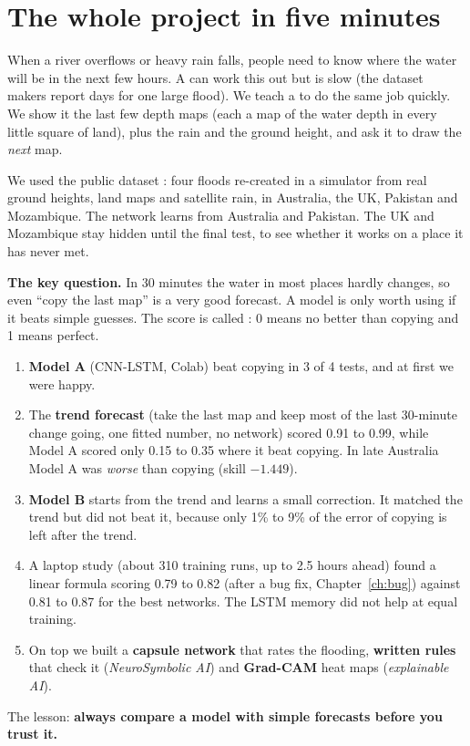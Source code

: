 \section{The whole project in five minutes}\label{ch:whole}

When a river overflows or heavy rain falls, people need to know where the water will be in the next few hours. A  can work this out but is slow (the dataset makers report days for one large flood). We teach a  to do the same job quickly. We show it the last few depth maps (each a map of the water depth in every little square of land), plus the rain and the ground height, and ask it to draw the \emph{next} map.

We used the public dataset : four floods re-created in a simulator from real ground heights, land maps and satellite rain, in Australia, the UK, Pakistan and Mozambique. The network learns from Australia and Pakistan. The UK and Mozambique stay hidden until the final test, to see whether it works on a place it has never met.

\textbf{The key question.} In 30 minutes the water in most places hardly changes, so even ``copy the last map'' is a very good forecast. A model is only worth using if it beats simple guesses. The score is called : 0 means no better than copying and 1 means perfect.

\begin{enumerate}
\item \textbf{Model A} (CNN-LSTM, Colab) beat copying in 3 of 4 tests, and at first we were happy.
\item The \textbf{trend forecast} (take the last map and keep most of the last 30-minute change going, one fitted number, no network) scored 0.91 to 0.99, while Model A scored only 0.15 to 0.35 where it beat copying. In late Australia Model A was \emph{worse} than copying (skill $-1.449$).
\item \textbf{Model B} starts from the trend and learns a small correction. It matched the trend but did not beat it, because only 1\% to 9\% of the error of copying is left after the trend.
\item A laptop study (about 310 training runs, up to 2.5 hours ahead) found a linear formula scoring 0.79 to 0.82 (after a bug fix, Chapter~\ref{ch:bug}) against 0.81 to 0.87 for the best networks. The LSTM memory did not help at equal training.
\item On top we built a \textbf{capsule network} that rates the flooding, \textbf{written rules} that check it (\emph{NeuroSymbolic AI}) and \textbf{Grad-CAM} heat maps (\emph{explainable AI}).
\end{enumerate}
The lesson: \textbf{always compare a model with simple forecasts before you trust it.}

